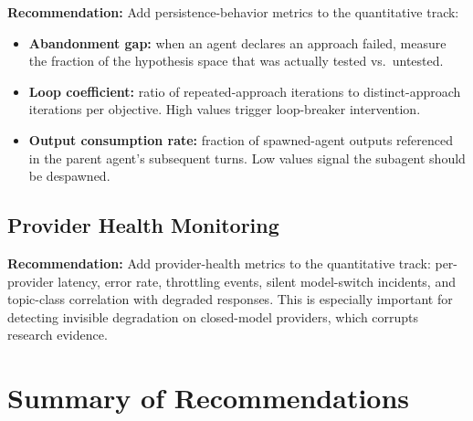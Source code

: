 \documentclass[11pt,a4paper]{article}
\begin{document}
\textbf{Recommendation:} Add persistence-behavior metrics to the
quantitative track:

\begin{itemize}[nosep]
  \item \textbf{Abandonment gap:} when an agent declares an approach
    failed, measure the fraction of the hypothesis space that was
    actually tested vs.\ untested.
  \item \textbf{Loop coefficient:} ratio of repeated-approach iterations
    to distinct-approach iterations per objective. High values trigger
    loop-breaker intervention.
  \item \textbf{Output consumption rate:} fraction of spawned-agent
    outputs referenced in the parent agent's subsequent turns. Low
    values signal the subagent should be despawned.
\end{itemize}

\subsection{Provider Health Monitoring}
\label{sec:provider-health}

\textbf{Recommendation:} Add provider-health metrics to the quantitative
track: per-provider latency, error rate, throttling events, silent
model-switch incidents, and topic-class correlation with degraded
responses. This is especially important for detecting invisible
degradation on closed-model providers, which corrupts research evidence.

\section{Summary of Recommendations}
\end{document}
